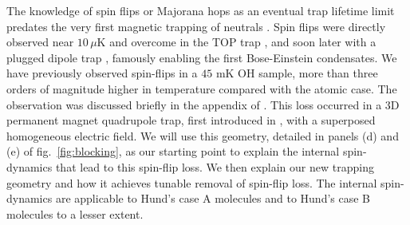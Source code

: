 \documentclass[%
 reprint,
 amsmath,amssymb,
 aps,
prl,
]{revtex4-1}
\begin{document}
The knowledge of spin flips or Majorana hops as an eventual trap lifetime limit predates the very first magnetic trapping of neutrals \cite{Migdall1985}. Spin flips were directly observed near $10\,\mu\text{K}$ and overcome in the TOP trap \cite{Petrich1995}, and soon later with a plugged dipole trap \cite{Davis1995}, famously enabling the first Bose-Einstein condensates. We have previously observed spin-flips in a $45\text{ mK}$ OH sample, more than three orders of magnitude higher in temperature compared with the atomic case. The observation was discussed briefly in the appendix of \cite{Stuhl2013}. This loss occurred in a 3D permanent magnet quadrupole trap, first introduced in \cite{Sawyer2008}, with a superposed homogeneous electric field. We will use this geometry, detailed in panels (d) and (e) of fig.~\ref{fig:blocking}, as our starting point to explain the internal spin-dynamics that lead to this spin-flip loss. We then explain our new trapping geometry and how it achieves tunable removal of spin-flip loss. The internal spin-dynamics are applicable to Hund's case A molecules and to Hund's case B molecules to a lesser extent.%
\end{document}

